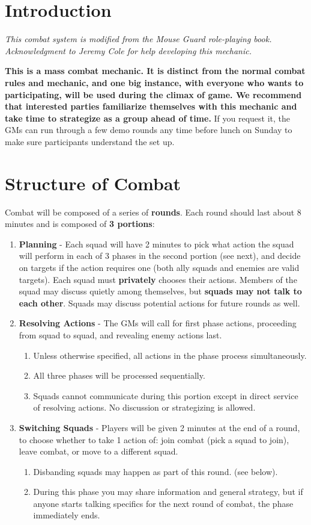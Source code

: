\documentclass[green]{gl2018}
\begin{document}
\name{\gBattleStrategy{}}

\section*{Introduction}
\emph{This combat system is modified from the Mouse Guard role-playing book. Acknowledgment to Jeremy Cole for help developing this mechanic.}

{\bf This is a mass combat mechanic. It is distinct from the normal combat rules and mechanic, and one big instance, with everyone who wants to participating, will be used during the climax of game. We recommend that interested parties familiarize themselves with this mechanic and take time to strategize as a group ahead of time.} If you request it, the GMs can run through a few demo rounds any time before lunch on Sunday to make sure participants understand the set up.

\section*{Structure of Combat}

Combat will be composed of a series of {\bf rounds}. Each round should last about 8 minutes and is composed of {\bf 3 portions}:
\begin{enumerate}
	\item {\bf Planning} - Each squad will have 2 minutes to pick what action the squad will perform in each of 3 phases in the second portion (see next), and decide on targets if the action requires one (both ally squads and enemies are valid targets). Each squad must {\bf privately} chooses their actions. Members of the squad may discuss quietly among themselves, but {\bf squads may not talk to each other}. Squads may discuss potential actions for future rounds as well.
	\item {\bf Resolving Actions} - The GMs will call for first phase actions, proceeding from squad to squad, and revealing enemy actions last. 
	\begin{enumerate}
		\item Unless otherwise specified, all actions in the phase process simultaneously.
		\item All three phases will be processed sequentially.
		\item Squads cannot communicate during this portion except in direct service of resolving actions. No discussion or strategizing is allowed.
	\end{enumerate}
	\item {\bf Switching Squads} - Players will be given 2 minutes at the end of a round, to choose whether to take 1 action of: join combat (pick a squad to join), leave combat, or move to a different squad. 
	\begin{enumerate}
		\item Disbanding squads may happen as part of this round. (see below).
		\item During this phase you may share information and general strategy, but if anyone starts talking specifics for the next round of combat, the phase immediately ends.
	\end{enumerate}
\end{enumerate}
\end{document}

